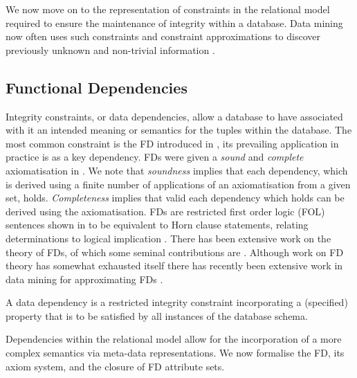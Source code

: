 We now move on to the representation of constraints in the relational
model required to ensure the maintenance of integrity within a
database. Data mining now often uses such constraints and constraint
approximations to discover previously unknown and non-trivial
information \cite{kdd96}.


\subsection{Functional Dependencies}
Integrity constraints, or data dependencies, allow a database to have
associated with it an intended meaning or semantics for the tuples
within the database.  The most common
constraint is the FD introduced in
\cite{cod72}, its prevailing application in practice is as
a key dependency.  FDs were given a {\em sound} and
{\em complete} axiomatisation in \cite{Arms74}.  We note that {\em
soundness} implies that each dependency, which is derived using a
finite number of applications of an axiomatisation from a given set,
holds. {\em Completeness} implies that valid each dependency which holds can be
derived using the axiomatisation. FDs
are restricted first order logic (FOL) sentences shown in
\cite{sdpf81} to be equivalent to Horn clause statements, relating
determinations to logical implication \cite{fag77,logicfound,mak87}. 
There has been extensive work on the theory of FDs,
of which some seminal contributions are
\cite{Arms74,fag77,bb79,sdpf81}. Although work on FD theory has somewhat
exhausted itself there has recently been extensive work in data mining for
approximating FDs \cite{Mann92,sf93,bb95,hkp98}.

\begin{definition}
\begin{rm}
A data dependency is a restricted integrity constraint incorporating a
(specified) property that is to be satisfied by all instances of the database
schema.
\end{rm}
\end{definition}

Dependencies within the relational model allow for the incorporation of a more
complex semantics via meta-data representations. We now formalise the
FD, its axiom system, and the closure of FD attribute sets. 

